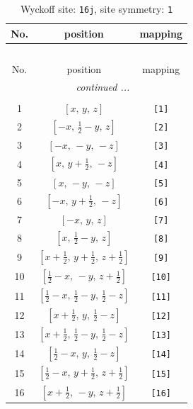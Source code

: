 \documentclass[fleqn,8pt]{jsarticle}
\begin{document}
\begin{longtable}{ccc}
\caption{Wyckoff site: {\tt 16j}, site symmetry: {\tt 1}}
 \\
 \hline \hline
No. & position & mapping \\ \hline \endfirsthead

\multicolumn{2}{l}{\tablename\ \thetable{}} \\
 \hline \hline
No. & position & mapping \\ \hline \endhead

 \hline \hline
\multicolumn{2}{r}{\footnotesize\it continued ...} \\ \endfoot

 \hline \hline
\multicolumn{2}{r}{} \\ \endlastfoot

1 & $\left[ x,\, y,\, z \right]$ & {\tt [1]} \\ \hline
2 & $\left[ - x,\, \frac{1}{2} - y,\, z \right]$ & {\tt [2]} \\ \hline
3 & $\left[ - x,\, - y,\, - z \right]$ & {\tt [3]} \\ \hline
4 & $\left[ x,\, y + \frac{1}{2},\, - z \right]$ & {\tt [4]} \\ \hline
5 & $\left[ x,\, - y,\, - z \right]$ & {\tt [5]} \\ \hline
6 & $\left[ - x,\, y + \frac{1}{2},\, - z \right]$ & {\tt [6]} \\ \hline
7 & $\left[ - x,\, y,\, z \right]$ & {\tt [7]} \\ \hline
8 & $\left[ x,\, \frac{1}{2} - y,\, z \right]$ & {\tt [8]} \\ \hline
9 & $\left[ x + \frac{1}{2},\, y + \frac{1}{2},\, z + \frac{1}{2} \right]$ & {\tt [9]} \\ \hline
10 & $\left[ \frac{1}{2} - x,\, - y,\, z + \frac{1}{2} \right]$ & {\tt [10]} \\ \hline
11 & $\left[ \frac{1}{2} - x,\, \frac{1}{2} - y,\, \frac{1}{2} - z \right]$ & {\tt [11]} \\ \hline
12 & $\left[ x + \frac{1}{2},\, y,\, \frac{1}{2} - z \right]$ & {\tt [12]} \\ \hline
13 & $\left[ x + \frac{1}{2},\, \frac{1}{2} - y,\, \frac{1}{2} - z \right]$ & {\tt [13]} \\ \hline
14 & $\left[ \frac{1}{2} - x,\, y,\, \frac{1}{2} - z \right]$ & {\tt [14]} \\ \hline
15 & $\left[ \frac{1}{2} - x,\, y + \frac{1}{2},\, z + \frac{1}{2} \right]$ & {\tt [15]} \\ \hline
16 & $\left[ x + \frac{1}{2},\, - y,\, z + \frac{1}{2} \right]$ & {\tt [16]} \\
\end{longtable}
\end{document}
